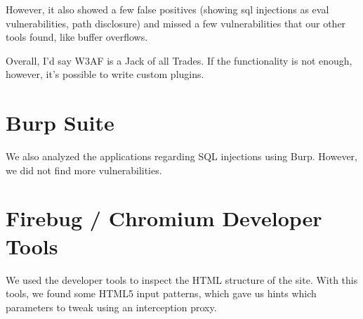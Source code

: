 However, it also showed a few false positives (showing sql injections as eval vulnerabilities, path disclosure) and missed a few vulnerabilities that our other tools found, like buffer overflows.

Overall, I'd say W3AF is a Jack of all Trades. If the functionality is not enough, however, it's possible to write custom plugins.

\section{Burp Suite}
We also analyzed the applications regarding SQL injections using Burp. However, we did not find more vulnerabilities.

\section{Firebug / Chromium Developer Tools}
We used the developer tools to inspect the HTML structure of the site. With this tools, we found some HTML5 input patterns, which gave us hints which parameters to tweak using an interception proxy.
